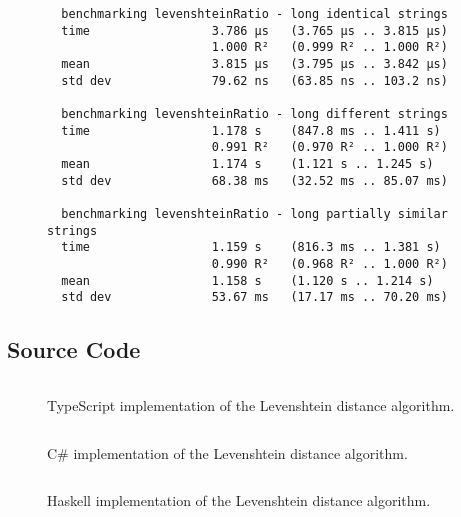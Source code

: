 \begin{landscape}
\begin{figure}[H]
\begin{verbatim}
  benchmarking levenshteinRatio - long identical strings
  time                 3.786 μs   (3.765 μs .. 3.815 μs)
                       1.000 R²   (0.999 R² .. 1.000 R²)
  mean                 3.815 μs   (3.795 μs .. 3.842 μs)
  std dev              79.62 ns   (63.85 ns .. 103.2 ns)

  benchmarking levenshteinRatio - long different strings
  time                 1.178 s    (847.8 ms .. 1.411 s)
                       0.991 R²   (0.970 R² .. 1.000 R²)
  mean                 1.174 s    (1.121 s .. 1.245 s)
  std dev              68.38 ms   (32.52 ms .. 85.07 ms)

  benchmarking levenshteinRatio - long partially similar strings
  time                 1.159 s    (816.3 ms .. 1.381 s)
                       0.990 R²   (0.968 R² .. 1.000 R²)
  mean                 1.158 s    (1.120 s .. 1.214 s)
  std dev              53.67 ms   (17.17 ms .. 70.20 ms)
  \end{verbatim}
\end{figure}
\hfill

\subsection*{Source Code}
\begin{figure}[H]
  \caption{TypeScript implementation of the Levenshtein distance algorithm.}
  \label{code:typescript}
  \inputminted[fontsize=\footnotesize]{typescript}{./doc/levenshteinRatio.ts}
\end{figure}

\hfill

\begin{figure}[H]
  \caption{C\# implementation of the Levenshtein distance algorithm.}
  \label{code:csharp}
  \inputminted[fontsize=\footnotesize]{csharp}{./doc/LevenshteinRatio.cs}
\end{figure}

\hfill

\begin{figure}[H]
  \caption{Haskell implementation of the Levenshtein distance algorithm.}
  \label{code:haskell}
  \inputminted[fontsize=\footnotesize]{haskell}{./doc/LevenshteinRatio.hs}
\end{figure}

\end{landscape}

